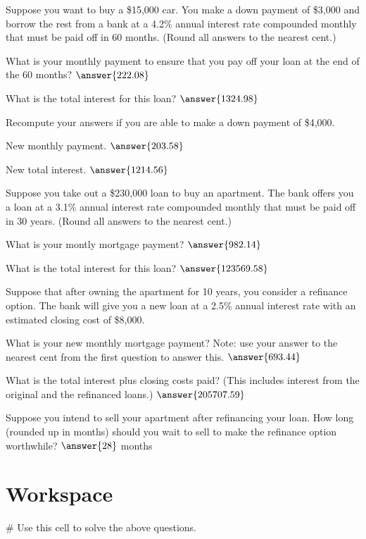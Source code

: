 \documentclass{ximera}
\begin{document}
\begin{question}
Suppose you want to buy a \$15,000 car. You make a down payment of \$3,000 and borrow the rest from a bank at a 4.2\% annual interest rate compounded monthly that must be paid off in 60 months. (Round all answers to the nearest cent.)
	
What is your monthly payment to ensure that you pay off your loan at the end of the 60 months? $\answer{222.08}$

What is the total interest for this loan? $\answer{1324.98}$

Recompute your answers if you are able to make a down payment of \$4,000.

New monthly payment. $\answer{203.58}$

New total interest. $\answer{1214.56}$
\end{question}

\begin{question}
	Suppose you take out a \$230,000 loan to buy an apartment. The bank offers you a loan at a 3.1\% annual interest rate compounded monthly that must be paid off in 30 years. (Round all answers to the nearest cent.)

What is your montly mortgage payment? $\answer{982.14}$

What is the total interest for this loan? $\answer{123569.58}$

Suppose that after owning the apartment for 10 years, you consider a refinance option. The bank will give you a new loan at a 2.5\% annual interest rate with an estimated closing cost of \$8,000.

What is your new monthly mortgage payment? Note: use your answer to the nearest cent from the first question to answer this. $\answer{693.44}$

What is the total interest plus closing costs paid? (This includes interest from the original and the refinanced loans.) $\answer{205707.59}$

Suppose you intend to sell your apartment after refinancing your loan. How long (rounded up in months) should you wait to sell to make the refinance option worthwhile? $\answer{28}$ months
\end{question}

\section{Workspace}

\begin{sageCell}
# Use this cell to solve the above questions.
\end{sageCell}
\end{document}
